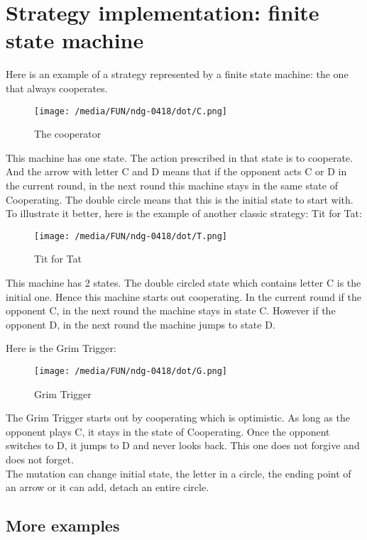 \documentclass[12.5pt]{report}
\begin{document}
\section{Strategy implementation: finite state machine}

Here is an example of a strategy represented by a finite state machine: the one that always cooperates.

\begin{figure}[h!]
\center
\texttt{[image: /media/FUN/ndg-0418/dot/C.png]}
\caption{The cooperator}
\end{figure}

This machine has one state. The action prescribed in that state is to cooperate. And the arrow with letter C and D means that if the opponent acts C or D in the current round, in the next round this machine stays in the same state of Cooperating. The double circle means that this is the initial state to start with. To illustrate it better, here is the example of another classic strategy: Tit for Tat:

\begin{figure}[h!]
\center
\texttt{[image: /media/FUN/ndg-0418/dot/T.png]}
\caption{Tit for Tat}
\end{figure}

This machine has 2 states. The double circled state which contains letter C is the initial one. Hence this machine starts out cooperating. In the current round if the opponent C, in the next round the machine stays in state C. However if the opponent D, in the next round the machine jumps to state D.

Here is the Grim Trigger:

\begin{figure}[h!]
\center
\texttt{[image: /media/FUN/ndg-0418/dot/G.png]}
\caption{Grim Trigger}
\end{figure}

The Grim Trigger starts out by cooperating which is optimistic. As long as the opponent plays C, it stays in the state of Cooperating. Once the opponent switches to D, it jumps to D and never looks back. This one does not forgive and does not forget.\\

The mutation can change initial state, the letter in a circle, the ending point of an arrow or it can add, detach an entire circle.

\subsection{More examples}
\end{document}
